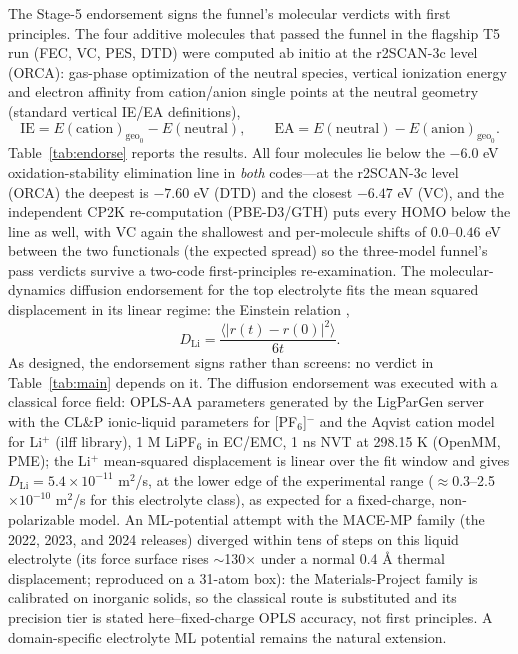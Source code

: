 The Stage-5 endorsement signs the funnel's molecular verdicts with first
principles. The four additive molecules that passed the funnel in the
flagship T5 run (FEC, VC, PES, DTD) were computed ab initio at the r2SCAN-3c
level (ORCA): gas-phase optimization of the neutral species, vertical
ionization energy and electron affinity from cation/anion single points at
the neutral geometry (standard vertical IE/EA definitions),
\begin{equation}
\label{eq:ieea}
\mathrm{IE} = E(\text{cation})_{\mathrm{geo}_0} - E(\text{neutral}),
\qquad
\mathrm{EA} = E(\text{neutral}) - E(\text{anion})_{\mathrm{geo}_0}.
\end{equation}
Table~\ref{tab:endorse} reports the results. All four molecules lie below
the $-6.0$ eV oxidation-stability elimination line in \emph{both} codes---at
the r2SCAN-3c level (ORCA) the deepest is $-7.60$ eV (DTD) and the closest
$-6.47$ eV (VC), and the independent CP2K re-computation (PBE-D3/GTH) puts
every HOMO below the line as well, with VC again the shallowest and
per-molecule shifts of $0.0$--$0.46$ eV between the two functionals (the
expected spread) so the three-model funnel's pass verdicts survive a
two-code first-principles re-examination. The molecular-dynamics diffusion
endorsement for the top electrolyte fits the mean squared displacement in
its linear regime: the Einstein relation \cite{einstein1905},
\begin{equation}
\label{eq:msd}
D_{\mathrm{Li}} = \frac{\langle |r(t) - r(0)|^2 \rangle}{6t}.
\end{equation} As designed, the endorsement signs rather than
screens: no verdict in Table~\ref{tab:main} depends on it. The
diffusion endorsement was executed with a classical force field: OPLS-AA
parameters generated by the LigParGen server
\cite{dodda2017ligpargen} with the CL\&P ionic-liquid parameters
\cite{clp2004} for [PF$_6$]$^-$ and the Aqvist cation model for Li$^+$ (ilff
library), 1 M
LiPF$_6$ in EC/EMC, 1 ns NVT at 298.15 K (OpenMM, PME); the Li$^+$
mean-squared displacement is linear over the fit window and gives
$D_{\mathrm{Li}} = 5.4\times10^{-11}$ m$^2$/s, at the lower edge of the
experimental range ($\approx$0.3--2.5$\times10^{-10}$ m$^2$/s for this
electrolyte class), as expected for a fixed-charge, non-polarizable model.
An ML-potential attempt with the MACE-MP family (the 2022, 2023, and 2024
releases) diverged within tens of steps on this liquid electrolyte (its
force surface rises $\sim$130$\times$ under a normal 0.4 \AA{} thermal
displacement; reproduced on a 31-atom box): the Materials-Project family
is calibrated on inorganic solids, so the classical route is substituted
and its precision tier is stated here--fixed-charge OPLS accuracy, not
first principles. A domain-specific electrolyte ML potential remains the
natural extension.

